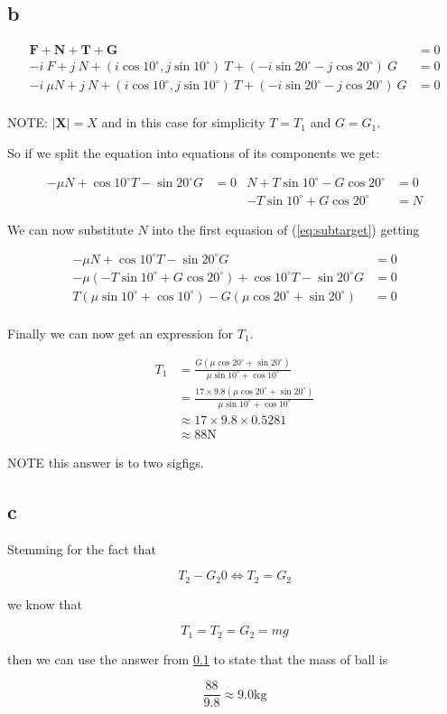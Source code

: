 \documentclass{article}
\begin{document}
\subsection{b}
\label{sec:newtonpain}

\begin{align*}
	\mathbf F + \mathbf N + \mathbf {T} + \mathbf G                                                          & = 0 \\
	-i~F + j~N + (i\cos {10^{\circ}}, j\sin {10^{\circ}})~T+ (-i\sin {20^{\circ}} -j\cos {20^{\circ}})~G     & = 0 \\
	-i~\mu N + j~N + (i\cos {10^{\circ}}, j\sin {10^{\circ}})~T+ (-i\sin {20^{\circ}} -j\cos {20^{\circ}})~G & = 0 \\
\end{align*}

NOTE: $\mid\mathbf X\mid = X$ and in this case for simplicity $T=T_1$ and $G = G_1$.

So if we split the equation into equations of its components we get:

\begin{align}
	\label{eq:subtarget}-\mu N + \cos {10^{\circ}} T- \sin {20^{\circ}} G & = 0 & N + T\sin {10^{\circ}} - G\cos {20^{\circ}} & = 0 \\
	                                                                      &     & - T\sin {10^\circ} + G \cos {20^\circ}      & = N
\end{align}

We can now substitute $N$ into the first equasion of (\ref{eq:subtarget}) getting

\begin{align*}
	-\mu N + \cos {10^{\circ}} T- \sin {20^{\circ}} G                                        & = 0 \\
	-\mu (- T\sin {10^\circ} + G \cos {20^\circ}) + \cos {10^{\circ}} T- \sin {20^{\circ}} G & = 0 \\
	T(\mu\sin {10^\circ} + \cos {10^\circ}) -G(\mu \cos {20^\circ} + \sin {20^{\circ}})      & = 0 \\
\end{align*}

Finally we can now get an expression for $T_1$.

\begin{align*}
	T_1 & = \frac {G(\mu \cos {20^\circ} + \sin {20^{\circ}})}{\mu\sin {10^\circ} + \cos {10^\circ}}           \\
	    & = \frac {17\times9.8(\mu \cos {20^\circ} + \sin {20^{\circ}})}{\mu\sin {10^\circ} + \cos {10^\circ}} \\
	    & \approx 17 \times 9.8 \times 0.5281                                                                  \\
	    & \approx 88 \mathrm N
\end{align*}

NOTE this answer is to two sigfigs.

\subsection{c}

Stemming for the fact that

$$T_2 - G_2 0 \iff T_2 = G_2$$

we know that

$$T_1 = T_2 = G_2 = mg$$

then we can use the answer from \ref{sec:newtonpain} to state that the mass of ball is

$$\frac {88}{9.8} \approx 9.0\mathrm{kg}$$
\end{document}
